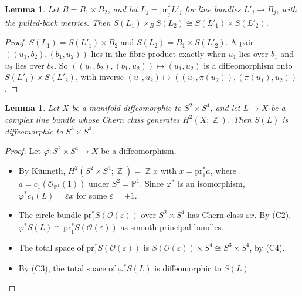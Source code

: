 \documentclass{article}
\DeclareMathOperator{\Z}{\mathbb{Z}}
\newtheorem{lemma}[theorem]{Lemma}
\theoremstyle{definition}
\theoremstyle{plain}
\newcommand{\PP}{\mathbb{P}}
\newcommand{\cO}{\mathcal{O}}
\begin{document}
\begin{lemma}\label{lem:productcircle}
Let $B=B_1\times B_2$, and let $L_j=\mathrm{pr}_j^*L'_j$ for line bundles $L'_j\to B_j$,
with the pulled-back metrics. Then $S(L_1)\times_BS(L_2)\cong S(L'_1)\times S(L'_2)$.
\end{lemma}
\begin{proof}
$S(L_1)=S(L'_1)\times B_2$ and $S(L_2)=B_1\times S(L'_2)$. A pair
$((u_1,b_2),(b_1,u_2))$ lies in the fibre product exactly when $u_1$ lies over $b_1$ and
$u_2$ lies over $b_2$. So $((u_1,b_2),(b_1,u_2))\mapsto(u_1,u_2)$ is a diffeomorphism onto
$S(L'_1)\times S(L'_2)$, with inverse $(u_1,u_2)\mapsto((u_1,\pi(u_2)),(\pi(u_1),u_2))$.
\end{proof}

\begin{lemma}\label{lem:S3S4}
Let $X$ be a manifold diffeomorphic to $S^2\times S^4$, and let $L\to X$ be a complex line
bundle whose Chern class generates $H^2(X;\Z)$. Then $S(L)$ is diffeomorphic to
$S^3\times S^4$.
\end{lemma}
\begin{proof}
Let $\varphi\colon S^2\times S^4\to X$ be a diffeomorphism.
\begin{itemize}
\item By Künneth, $H^2(S^2\times S^4;\Z)=\Z x$ with $x=\mathrm{pr}_1^*a$, where
  $a=c_1(\cO_{\PP^1}(1))$ under $S^2=\PP^1$. Since $\varphi^*$ is an isomorphism,
  $\varphi^*c_1(L)=\varepsilon x$ for some $\varepsilon=\pm1$.
\item The circle bundle $\mathrm{pr}_1^*S(\cO(\varepsilon))$ over $S^2\times S^4$ has Chern
  class $\varepsilon x$. By (C2), $\varphi^*S(L)\cong\mathrm{pr}_1^*S(\cO(\varepsilon))$ as smooth
  principal bundles.
\item The total space of $\mathrm{pr}_1^*S(\cO(\varepsilon))$ is
  $S(\cO(\varepsilon))\times S^4\cong S^3\times S^4$, by (C4).
\item By (C3), the total space of $\varphi^*S(L)$ is diffeomorphic to $S(L)$.
\end{itemize}
\end{proof}
\end{document}

